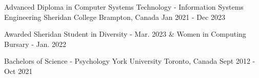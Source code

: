 \begin{cventries}
  \cventry
    {Advanced Diploma in Computer Systems Technology - Information Systems Engineering}
    {Sheridan College}
    {Brampton, Canada}
    {Jan 2021 - Dec 2023}
    {
      \begin{cvitems}
        \item{Awarded Sheridan Student in Diversity - Mar. 2023 \& Women in Computing Bursary - Jan. 2022}
      \end{cvitems}
    }
   \cventry
    {Bachelors of Science - Psychology}
    {York University}
    {Toronto, Canada}
    {Sept 2012 - Oct 2021}
    { 
      }
\end{cventries}
